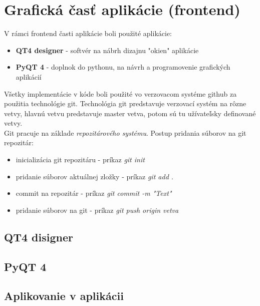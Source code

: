 \chapter{Grafická časť aplikácie (frontend)}
V rámci frontend časti aplikácie boli použité aplikácie:\begin{itemize}
\item \textbf{QT4 designer} - softvér na nábrh dizajnu "okien" aplikácie
\item \textbf{PyQT 4} - doplnok do pythonu, na návrh a programovenie grafických aplikácií
\end{itemize}
Všetky implementácie v kóde boli použité vo verzovacom systéme github za použitia technológie git. Technológia git predstavuje verzovací systém na rôzne vetvy, hlavnú vetvu predstavuje master vetva, potom sú tu užívateľsky definované vetvy. \\
Git pracuje na základe \textit{repozitárového systému}. Postup pridania súborov na git repozitár:\begin{itemize}
\item inicializácia git repozitáru - príkaz \textit{git init}
\item pridanie súborov aktuálnej zložky - príkaz \textit{git add .}
\item commit na repozitár - príkaz \textit{git commit -m "Text"}
\item pridanie súborov na git - príkaz \textit{git push origin vetva}
\end{itemize} 
\section{QT4 disigner}
\section{PyQT 4}
\section{Aplikovanie v aplikácii}
